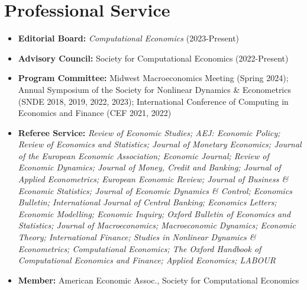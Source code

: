 \documentclass[10pt,letterpaper,en-US]{article}
\begin{document}
\section*{Professional Service}
\begin{itemize}
\item \textbf{Editorial Board:} \emph{Computational Economics} (2023-Present)
\item \textbf{Advisory Council:} Society for Computational Economics (2022-Present)
\item \textbf{Program Committee:} Midwest Macroeconomics Meeting (Spring 2024); Annual Symposium of the Society for Nonlinear Dynamics \& Econometrics (SNDE 2018, 2019, 2022, 2023); International Conference of Computing in Economics and Finance (CEF 2021, 2022)
\item \textbf{Referee Service:} \emph{Review of Economic Studies; AEJ: Economic Policy; Review of Economics and Statistics; Journal of Monetary Economics; Journal of the European Economic Association; Economic Journal; Review of Economic Dynamics; Journal of Money, Credit and Banking; Journal of Applied Econometrics; European Economic Review; Journal of Business \& Economic Statistics; Journal of Economic Dynamics \& Control; Economics Bulletin; International Journal of Central Banking; Economics Letters; Economic Modelling; Economic Inquiry; Oxford Bulletin of Economics and Statistics; Journal of Macroeconomics; Macroeconomic Dynamics; Economic Theory; International Finance; Studies in Nonlinear Dynamics \& Econometrics; Computational Economics; The Oxford Handbook of Computational Economics and Finance; Applied Economics; LABOUR}
\item \textbf{Member:} American Economic Assoc., Society for Computational Economics
\end{itemize}
\end{document}
